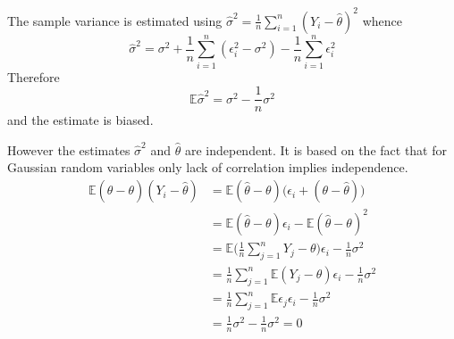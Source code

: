 \documentclass[a4paper]{article}
\newcommand{\Ex}{\mathbb{E}}
\begin{document}
The sample variance is estimated using $\hat{\sigma}^2 = \frac{1}{n}\sum_{i=1}^n(Y_i - \hat{\theta})^2$ whence
\[\hat{\sigma}^2 = \sigma^2 + \frac{1}{n}\sum_{i=1}^n (\epsilon_i^2 - \sigma^2) - \frac{1}{n} \sum_{i=1}^n \epsilon_i^2\]
Therefore
\[\Ex \hat{\sigma}^2 = \sigma^2 - \frac{1}{n}\sigma^2 \]
and the estimate is biased.

However the estimates $\hat{\sigma}^2$ and $\hat{\theta}$ are independent. It is based on the fact that for Gaussian random variables only lack of correlation implies independence.
\begin{align*}
	\Ex (\hat{\theta}-\theta) (Y_i - \hat{\theta})
	&= \Ex (\hat{\theta}-\theta) \big(\epsilon_i + (\theta - \hat{\theta}) \big) \\
	&= \Ex (\hat{\theta}-\theta)\epsilon_i - \Ex (\hat{\theta}-\theta)^2 \\
	&= \Ex \Big(\frac{1}{n}\sum_{j=1}^n Y_j-\theta\Big)\epsilon_i - \frac{1}{n}\sigma^2 \\
	&= \frac{1}{n}\sum_{j=1}^n \Ex (Y_j - \theta)\epsilon_i - \frac{1}{n}\sigma^2 \\
	&= \frac{1}{n}\sum_{j=1}^n \Ex \epsilon_j\epsilon_i - \frac{1}{n}\sigma^2 \\
	&= \frac{1}{n}\sigma^2 - \frac{1}{n}\sigma^2 = 0
\end{align*}


\end{document}
